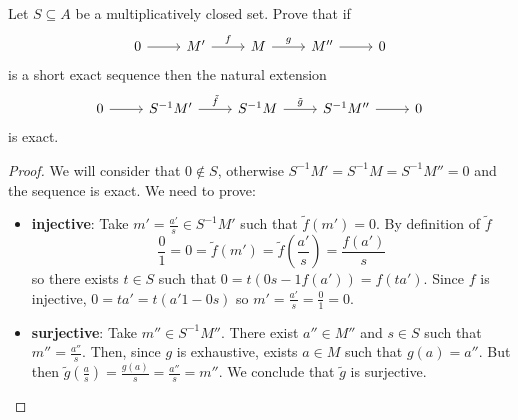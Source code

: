 \begin{problem}
    Let $S \subseteq A$ be a multiplicatively closed set.
    Prove that if
    \[\begin{tikzcd}
	0 & {M'} & M & {M''} & 0
	\arrow[from=1-1, to=1-2]
	\arrow["f", from=1-2, to=1-3]
	\arrow["g", from=1-3, to=1-4]
	\arrow[from=1-4, to=1-5]
    \end{tikzcd}\]
    is a short exact sequence then the natural extension
    \[\begin{tikzcd}
	0 & {S^{-1}M'} & {S^{-1}M} & {S^{-1}M''} & 0
	\arrow[from=1-1, to=1-2]
	\arrow["{\tilde{f}}", from=1-2, to=1-3]
	\arrow["{\tilde{g}}", from=1-3, to=1-4]
	\arrow[from=1-4, to=1-5]
    \end{tikzcd}\]
    is exact.
    \begin{sol}
        \begin{proof}
            We will consider that $0 \notin S$, otherwise $S^{-1}M' = S^{-1}M = S^{-1}M'' = 0$ and the sequence is exact.
            We need to prove:
            \begin{itemize}
                \item {}\textbf{ injective}:
                Take $m' = \frac{a'}{s} \in S^{-1}M'$ such that $\tilde{f}(m') = 0$.
                By definition of $\tilde{f}$
                \[
                    \frac{0}{1} = 0 = \tilde{f}(m') = \tilde{f}\left(\frac{a'}{s}\right) = \frac{f(a')}{s}
                \]
                so there exists $t \in S$ such that $0 = t (0 s - 1 f(a')) = f(t a')$.
                Since $f$ is injective, $0 = t a' = t (a'1 - 0 s)$ so
                $m' = \frac{a'}{s} = \frac{0}{1} = 0$.

                \item {}\textbf{ surjective}:
                Take $m'' \in S^{-1}M''$.
                There exist $a'' \in M''$ and $s \in S$ such that $m'' = \frac{a''}{s}$.
                Then, since $g$ is exhaustive, exists $a \in M$ such that $g(a) = a''$.
                But then $\tilde{g}(\frac{a}{s}) = \frac{g(a)}{s} = \frac{a''}{s} = m''$.
                We conclude that $\tilde{g}$ is surjective.


\end{itemize}
\end{proof}
\end{sol}
\end{problem}
